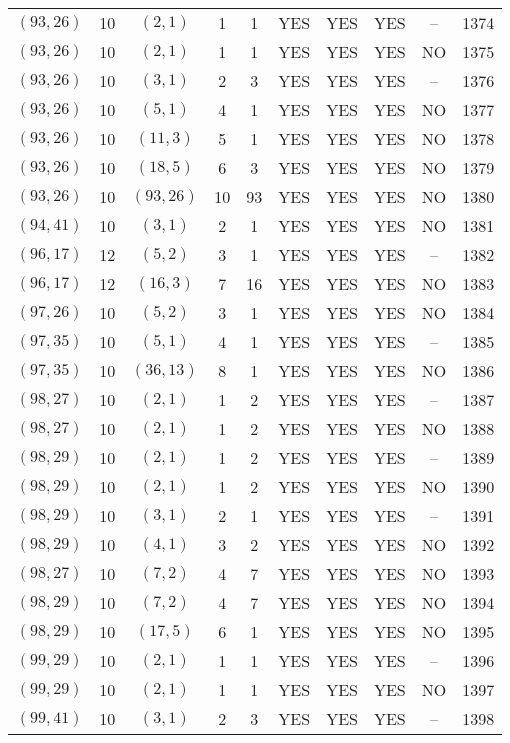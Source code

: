 \begin{longtable}{|c|c|c|c|c|c|c|c|c|c|}
$(93, 26)$ & 10 & $(2, 1)$ & 1 & 1 & YES & YES & YES & -- & 1374\\
$(93, 26)$ & 10 & $(2, 1)$ & 1 & 1 & YES & YES & YES & NO & 1375\\
$(93, 26)$ & 10 & $(3, 1)$ & 2 & 3 & YES & YES & YES & -- & 1376\\
$(93, 26)$ & 10 & $(5, 1)$ & 4 & 1 & YES & YES & YES & NO & 1377\\
$(93, 26)$ & 10 & $(11, 3)$ & 5 & 1 & YES & YES & YES & NO & 1378\\
$(93, 26)$ & 10 & $(18, 5)$ & 6 & 3 & YES & YES & YES & NO & 1379\\
$(93, 26)$ & 10 & $(93, 26)$ & 10 & 93 & YES & YES & YES & NO & 1380\\
$(94, 41)$ & 10 & $(3, 1)$ & 2 & 1 & YES & YES & YES & NO & 1381\\
$(96, 17)$ & 12 & $(5, 2)$ & 3 & 1 & YES & YES & YES & -- & 1382\\
$(96, 17)$ & 12 & $(16, 3)$ & 7 & 16 & YES & YES & YES & NO & 1383\\
$(97, 26)$ & 10 & $(5, 2)$ & 3 & 1 & YES & YES & YES & NO & 1384\\
$(97, 35)$ & 10 & $(5, 1)$ & 4 & 1 & YES & YES & YES & -- & 1385\\
$(97, 35)$ & 10 & $(36, 13)$ & 8 & 1 & YES & YES & YES & NO & 1386\\
$(98, 27)$ & 10 & $(2, 1)$ & 1 & 2 & YES & YES & YES & -- & 1387\\
$(98, 27)$ & 10 & $(2, 1)$ & 1 & 2 & YES & YES & YES & NO & 1388\\
$(98, 29)$ & 10 & $(2, 1)$ & 1 & 2 & YES & YES & YES & -- & 1389\\
$(98, 29)$ & 10 & $(2, 1)$ & 1 & 2 & YES & YES & YES & NO & 1390\\
$(98, 29)$ & 10 & $(3, 1)$ & 2 & 1 & YES & YES & YES & -- & 1391\\
$(98, 29)$ & 10 & $(4, 1)$ & 3 & 2 & YES & YES & YES & NO & 1392\\
$(98, 27)$ & 10 & $(7, 2)$ & 4 & 7 & YES & YES & YES & NO & 1393\\
$(98, 29)$ & 10 & $(7, 2)$ & 4 & 7 & YES & YES & YES & NO & 1394\\
$(98, 29)$ & 10 & $(17, 5)$ & 6 & 1 & YES & YES & YES & NO & 1395\\
$(99, 29)$ & 10 & $(2, 1)$ & 1 & 1 & YES & YES & YES & -- & 1396\\
$(99, 29)$ & 10 & $(2, 1)$ & 1 & 1 & YES & YES & YES & NO & 1397\\
$(99, 41)$ & 10 & $(3, 1)$ & 2 & 3 & YES & YES & YES & -- & 1398\\

\end{longtable}
